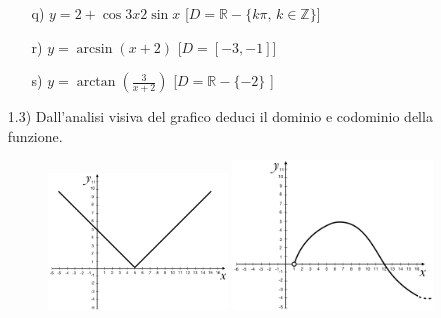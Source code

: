 \begin{itemize}
\begin{itemize}
\item[q)]\(y={2+\cos{3x}}{2\sin{x}}\)   \hfill  
   [\(D=\mathbb{R}-\{k\pi,\,k\in \mathbb{Z}\}\)]
  \item[r)] \(y=\arcsin(x+2)\)  
   \hfill  [\(D=[-3, -1]\)]
  
\item[s)]\(y=\arctan(\frac{3}{x+2}) \)  \hfill  
   [\(D=\mathbb{R}-\{-2\}\) ]\\

  \end{itemize}

\newpage
  
  \item[1.3)] Dall'analisi visiva del grafico deduci il 
dominio e codominio della funzione.
  \begin{figure}[htpb!]
  \centering


\includegraphics[width=0.45\textwidth]{img/funz_16.png} \quad 
\includegraphics[width=0.5\textwidth]{img/funz_17.png}  
  

\end{figure}
\end{itemize}
